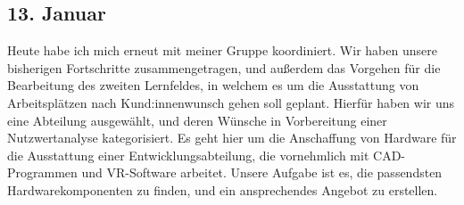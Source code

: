\subsection{13. Januar}
Heute habe ich mich erneut mit meiner Gruppe koordiniert. Wir haben unsere bisherigen Fortschritte zusammengetragen, und außerdem das Vorgehen für die Bearbeitung des zweiten Lernfeldes, in welchem es um die Ausstattung von Arbeitsplätzen nach Kund:innenwunsch gehen soll geplant. Hierfür haben wir uns eine Abteilung ausgewählt, und deren Wünsche in Vorbereitung einer Nutzwertanalyse kategorisiert. Es geht hier um die Anschaffung von Hardware für die Ausstattung einer Entwicklungsabteilung, die vornehmlich mit CAD-Programmen und VR-Software arbeitet. Unsere Aufgabe ist es, die passendsten Hardwarekomponenten zu finden, und ein ansprechendes Angebot zu erstellen.